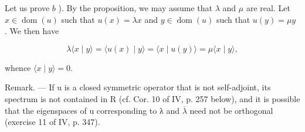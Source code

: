 Let us prove \(b\) ). By the proposition, we may assume that \(\lambda\) and \(\mu\) are real. Let \(x \in \operatorname{dom}(u)\) such that \(u(x) = \lambda x\) and \(y \in \operatorname{dom}(u)\) such that \(u(y) = \mu y\) . We then have

\[
\lambda \langle x \mid y \rangle = \langle u (x) \mid y \rangle = \langle x \mid u (y) \rangle = \mu \langle x \mid y \rangle ,
\]

whence \(\langle x \mid y \rangle = 0.\)

Remark. --- If u is a closed symmetric operator that is not self-adjoint, its spectrum is not contained in R (cf. Cor. 10 of IV, p. 257 below), and it is possible that the eigenspaces of u corresponding to λ and \(\overline{\lambda}\) need not be orthogonal (exercise 11 of IV, p. 347).

